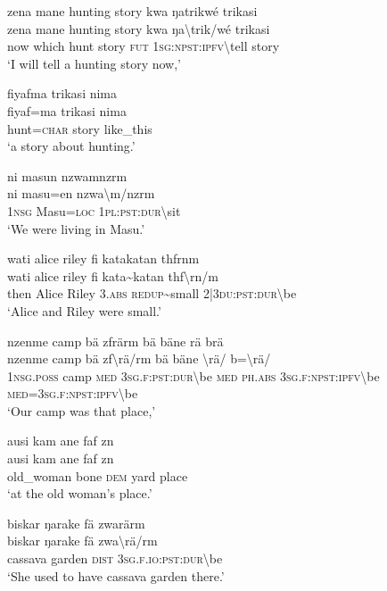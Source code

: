 \ea\label{ex:12:a718}
zena mane hunting story kwa ŋatrikwé trikasi\\
\gll zena	mane	hunting	story	kwa	ŋa{\textbackslash}trik/wé	trikasi\\
     now	which	hunt	story	\textsc{fut}	1\textsc{sg}:\textsc{npst}:\textsc{ipfv}{\textbackslash}tell	story\\
\glt `I will tell a hunting story now,'
\z

\ea\label{ex:12:a720}
fiyafma trikasi nima\\
\gll fiyaf=ma	trikasi	nima\\
     hunt=\textsc{char}	story	like\_this\\
\glt `a story about hunting.'
\z

\ea\label{ex:12:a721}
ni masun nzwamnzrm\\
\gll ni	masu=en	nzwa{\textbackslash}m/nzrm\\
     1\textsc{nsg}	Masu=\textsc{loc}	1\textsc{pl}:\textsc{pst}:\textsc{dur}{\textbackslash}sit\\
\glt `We were living in Masu.'
\z

\ea\label{ex:12:a722}
wati alice riley fi katakatan thfrnm\\
\gll wati	alice	riley	fi	kata{\textasciitilde}katan	thf{\textbackslash}rn/m\\
     then	Alice	Riley	3.\textsc{abs}	\textsc{redup}{\textasciitilde}small	2|3\textsc{du}:\textsc{pst}:\textsc{dur}{\textbackslash}be\\
\glt `Alice and Riley were small.'
\z

\ea\label{ex:12:a723}
nzenme camp bä zfrärm bä bäne rä brä\\
\gll nzenme	camp	bä	zf{\textbackslash}rä/rm	bä	bäne	{\textbackslash}rä/	b={\textbackslash}rä/\\
     1\textsc{nsg}.\textsc{poss}	camp	\textsc{med}	3\textsc{sg}.\textsc{f}:\textsc{pst}:\textsc{dur}{\textbackslash}be	\textsc{med}	\textsc{ph}.\textsc{abs}	3\textsc{sg}.\textsc{f}:\textsc{npst}:\textsc{ipfv}{\textbackslash}be	\textsc{med}=3\textsc{sg}.\textsc{f}:\textsc{npst}:\textsc{ipfv}{\textbackslash}be\\
\glt `Our camp was that place,'
\z

\ea\label{ex:12:a725}
ausi kam ane faf zn\\
\gll ausi	kam	ane	faf	zn\\
     old\_woman	bone	\textsc{dem}	yard	place\\
\glt `at the old woman's place.'
\z

\ea\label{ex:12:a726}
biskar ŋarake fä zwarärm\\
\gll biskar	ŋarake	fä	zwa{\textbackslash}rä/rm\\
     cassava	garden	\textsc{dist}	3\textsc{sg}.\textsc{f}.\textsc{io}:\textsc{pst}:\textsc{dur}{\textbackslash}be\\
\glt `She used to have cassava garden there.'
\z

